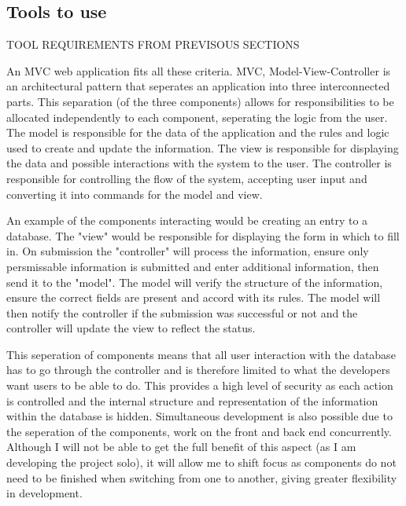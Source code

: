 \documentclass[a4paper,12pt]{article}
\begin{document}
\subsection{Tools to use}
\par TOOL REQUIREMENTS FROM PREVISOUS SECTIONS
\vspace{5mm}
\par An MVC web application fits all these criteria. MVC, Model-View-Controller is an architectural pattern that seperates an application into three interconnected parts. This separation (of the three components) allows for responsibilities to be allocated independently to each component, seperating the logic from the user. The model is responsible for the data of the application and the rules and logic used to create and update the information. The view is responsible for displaying the data and possible interactions with the system to the user. The controller is responsible for controlling the flow of the system,  accepting user input and converting it into commands for the model and view.
\vspace{5mm}
\par An example of the components interacting would be creating an entry to a database. The "view" would be responsible for displaying the form in which to fill in. On submission the "controller" will process the information, ensure only persmissable information is submitted and enter additional information, then send it to the "model". The model will verify the structure of the information, ensure the correct fields are present and accord with its rules. The model will then notify the controller if the submission was successful or not and the controller will update the view to reflect the status.
\vspace{5mm}
\par This seperation of components means that all user interaction with the database has to go through the controller and is therefore limited to what the developers want users to be able to do. This provides a high level of security as each action is controlled and the internal structure and representation of the information within the database is hidden. Simultaneous development is also possible due to the seperation of the components, work on the front and back end concurrently. Although I will not be able to get the full benefit of this aspect (as I am developing the project solo), it will allow me to shift focus as components do not need to be finished when switching from one to another, giving greater flexibility in development. 
\end{document}
